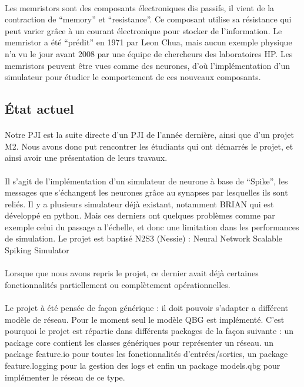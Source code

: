 \documentclass[a4paper,10pt]{article}
\begin{document}
\paragraph{}
Les memristors sont des composants électroniques dis passifs, il vient de la contraction de “memory” et “resistance”. Ce composant utilise sa résistance qui peut varier grâce à un courant électronique pour stocker de l’information. Le memristor a été “prédit” en 1971 par Leon Chua, mais aucun exemple physique n’a vu le jour avant 2008 par une équipe de chercheurs des laboratoires HP. Les memristors peuvent être vues comme des neurones, d’où l’implémentation d’un simulateur pour étudier le comportement de ces nouveaux composants.

\subsection{État actuel}

\paragraph{}
Notre PJI est la suite directe d’un PJI de l’année dernière, ainsi que d’un projet M2. Nous avons donc put rencontrer les étudiants qui ont démarrés le projet, et ainsi avoir une présentation de leurs travaux.

\paragraph{}
Il s’agit de l’implémentation d’un simulateur de neurone à base de “Spike”, les messages que s’échangent les neurones grâce au synapses par lesquelles ils sont reliés. Il y a plusieurs simulateur déjà existant, notamment BRIAN qui est développé en python. Mais ces derniers ont quelques problèmes comme par exemple celui du passage a l’échelle, et donc une limitation dans les performances de simulation. Le projet est baptisé N2S3 (Nessie) : Neural Network Scalable Spiking Simulator

\paragraph{}
Lorsque que nous avons repris le projet, ce dernier avait déjà certaines fonctionnalités partiellement ou complètement opérationnelles.

\paragraph{}
Le projet à été pensée de façon générique : il doit pouvoir s’adapter a différent modèle de réseau. Pour le moment seul le modèle QBG est implémenté. C’est pourquoi le projet est répartie dans différents packages de la façon suivante : un package core contient les classes génériques pour représenter un réseau. un package feature.io pour toutes les fonctionnalités d’entrées/sorties, un package feature.logging pour la gestion des logs et enfin un package models.qbg pour implémenter le réseau de ce type.
\end{document}
